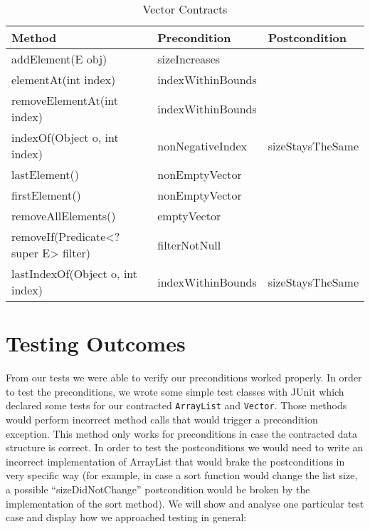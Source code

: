 \documentclass[a4paper]{article}
\begin{document}
	\begin{table}[h!]
	\begin{tabular}{|l|l|l|}
	\hline
	\textbf{Method}                      & \textbf{Precondition}        & \textbf{Postcondition} \\ \hline
	addElement(E obj)                         & sizeIncreases           &                        \\ \hline
	elementAt(int index)                      & indexWithinBounds                 &                        \\ \hline
	removeElementAt(int index)         & indexWithinBounds                 &       \\ \hline
	indexOf(Object o, int index)          &  nonNegativeIndex      & sizeStaysTheSame   \\ \hline
	lastElement()    							  & nonEmptyVector         &                                    \\ \hline
	firstElement()             				  & nonEmptyVector         &                         		      \\ \hline
	removeAllElements()                             & emptyVector                    &                        \\ \hline
	removeIf(Predicate<? super E> filter)          & filterNotNull &                                    \\ \hline
	lastIndexOf(Object o, int index)               & indexWithinBounds    &      sizeStaysTheSame   \\ \hline
\end{tabular}
\caption{Vector Contracts}
	\label{table:2}
\end{table}

\section{Testing Outcomes}
From our tests we were able to verify our preconditions worked properly. In order to test the preconditions, we wrote some simple test classes with JUnit which declared some tests for our contracted \lstinline{ArrayList} and \lstinline{Vector}. Those methods would perform incorrect method calls that would trigger a precondition exception. This method only works for preconditions in case the contracted data structure is correct. In order to test the postconditions we would need to write an incorrect implementation of ArrayList that would brake the postconditions in very specific way (for example, in case a sort function would change the list size, a possible ``sizeDidNotChange'' postcondition would be broken by the implementation of the sort method). We will show and analyse one particular test case and display how we approached testing in general:
\end{document}
